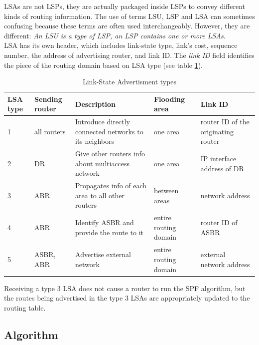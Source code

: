 LSAs are not LSPs, they are actually packaged inside LSPs to convey different kinds of routing information. The use of terms LSU, LSP and LSA can sometimes confusing because these terms are often used interchangeably. However, they are different: \emph{An LSU is a type of LSP, an LSP contains one or more LSAs}.\\
 
LSA has its own header, which includes link-state type, link's cost, sequence number, the address of advertising router, and link ID. The \emph{link ID} field identifies the piece of the routing domain based on LSA type (see table \ref{LSA-type}).

\begin{table}[h]
\centering
\caption{Link-State Advertisment types}
\label{LSA-type}
\begin{tabular}{ | p{2em} | p{3em} | p{} | p{} | p{} | }
\hline
LSA type & Sending router & Description                                            & Flooding area        & Link ID                             \\ \hline
1        & all routers    & Introduce directly connected networks to its neighbors & one area             & router ID of the originating router \\ \hline
2        & DR             & Give other routers info about multiaccess network      & one area             & IP interface address of DR		\\ \hline
3        & ABR            & Propagates info of each area to all other routers      & between areas        & network address                 \\ \hline
4        & ABR            & Identify ASBR and provide the route to it              & entire routing domain& router ID of ASBR                 \\ \hline
5        & ASBR, ABR      & Advertise external network                             & entire routing domain& external network address         \\ \hline
\end{tabular}
\end{table}

Receiving a type 3 LSA does not cause a router to run the SPF algorithm, but the routes being advertised in the type 3 LSAs are appropriately updated to the routing table.

\subsection{Algorithm}\label{sec:algorithm}

